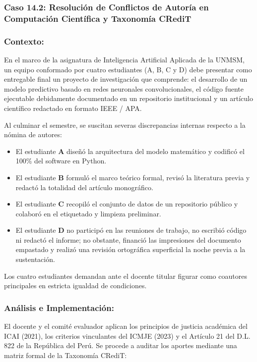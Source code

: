 \subsubsection{Caso 14.2: Resolución de Conflictos de Autoría en Computación Científica y Taxonomía CRediT}

\subsubsection*{Contexto:}
En el marco de la asignatura de Inteligencia Artificial Aplicada de la UNMSM, un equipo conformado por cuatro estudiantes (A, B, C y D) debe presentar como entregable final un proyecto de investigación que comprende: el desarrollo de un modelo predictivo basado en redes neuronales convolucionales, el código fuente ejecutable debidamente documentado en un repositorio institucional y un artículo científico redactado en formato IEEE / APA. 

Al culminar el semestre, se suscitan severas discrepancias internas respecto a la nómina de autores:
\begin{itemize}
    \item El estudiante \textbf{A} diseñó la arquitectura del modelo matemático y codificó el 100\% del software en Python.
    \item El estudiante \textbf{B} formuló el marco teórico formal, revisó la literatura previa y redactó la totalidad del artículo monográfico.
    \item El estudiante \textbf{C} recopiló el conjunto de datos de un repositorio público y colaboró en el etiquetado y limpieza preliminar.
    \item El estudiante \textbf{D} no participó en las reuniones de trabajo, no escribió código ni redactó el informe; no obstante, financió las impresiones del documento empastado y realizó una revisión ortográfica superficial la noche previa a la sustentación.
\end{itemize}
Los cuatro estudiantes demandan ante el docente titular figurar como coautores principales en estricta igualdad de condiciones.

\subsubsection*{Análisis e Implementación:}
El docente y el comité evaluador aplican los principios de justicia académica del ICAI (2021), los criterios vinculantes del ICMJE (2023) y el Artículo 21 del D.L. 822 de la República del Perú. Se procede a auditar los aportes mediante una matriz formal de la Taxonomía CRediT:

